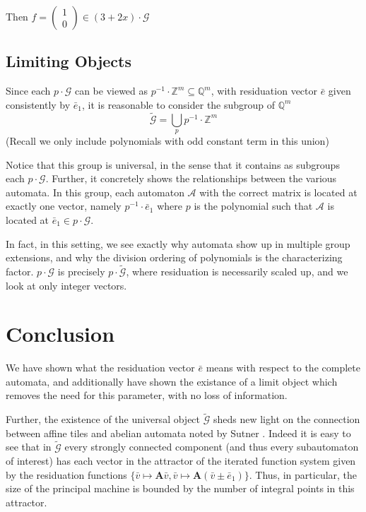 \documentclass[runningheads]{llncs}
\newcommand{\A}{\mathcal{A}}
\newcommand{\G}{\mathcal{G}}
\newcommand{\Z}{\mathbb{Z}}
\newcommand{\Q}{\mathbb{Q}}
\newcommand{\2}{\textbf{2}}
\newcommand{\Am}{\textbf{A}}
\renewcommand{\v}{\bar{v}}
\newcommand{\e}{\bar{e}}
\begin{document}
Then $f = \begin{pmatrix} 1 \\ 0 \end{pmatrix} \in (3+2x) \cdot \G$

\subsection{Limiting Objects}
Since each $p \cdot \G$ can be viewed as $p^{-1} \cdot \Z^m \subseteq \Q^m$,
with residuation vector $\e$ given consistently by $\e_1$,
it is reasonable to consider the subgroup of $\Q^m$
\[ 
  \widetilde{\G} = \bigcup_p p^{-1} \cdot \Z^m 
\]
(Recall we only include polynomials with odd constant term in this union)

Notice that this group is universal, in the sense that it contains as
subgroups each $p \cdot \G$. Further, it concretely shows the relationships
between the various automata. In this group, each automaton $\A$ with
the correct matrix is located at exactly one vector, namely 
$p^{-1} \cdot \e_1$ where $p$ is the polynomial such that $\A$ is located
at $\e_1 \in p \cdot \G$.

In fact, in this setting, we see exactly why automata show up in multiple
group extensions, and why the division ordering of polynomials is the 
characterizing factor. $p \cdot \G$ is precisely $p \cdot \widetilde{\G}$, 
where residuation is necessarily scaled up, and we look at only integer
vectors.

\section{Conclusion}
We have shown what the residuation vector $\e$ means with respect to the
complete automata, and additionally have shown the existance of a limit
object which removes the need for this parameter, with no loss of information.

Further, the existence of the universal object $\widetilde{\G}$ sheds new light
on the connection between affine tiles 
\cite{LagariasWang96:tiles, LagariasWang97:integral_tiles}
and abelian automata noted by Sutner
\cite{Sutner18:abelian_automata}. Indeed it is easy to see that in 
$\widetilde{\G}$ every strongly connected component 
(and thus every subautomaton of interest) has each vector in the attractor 
of the iterated function system given by the residuation functions 
$\{ \v \mapsto \Am \v, \v \mapsto \Am (\v \pm \e_1) \}$.
Thus, in particular, the size of the principal machine is bounded by the
number of integral points in this attractor. 
\end{document}
